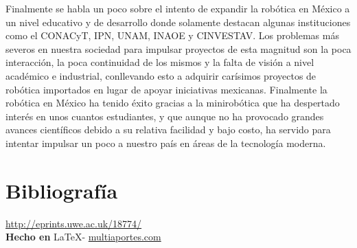 \documentclass{article}
\begin{document}
{Finalmente se habla un poco sobre el intento de expandir la robótica en México a un nivel educativo y de desarrollo donde solamente destacan algunas instituciones como el CONACyT, IPN, UNAM, INAOE y CINVESTAV. Los problemas más severos en nuestra sociedad para impulsar proyectos de esta magnitud son la poca interacción, la poca continuidad de los mismos y la falta de visión a nivel académico e industrial, conllevando esto a adquirir carísimos proyectos de robótica importados en lugar de apoyar iniciativas mexicanas. Finalmente la robótica en México ha tenido éxito gracias a la minirobótica que ha despertado interés en unos cuantos estudiantes, y que aunque no ha provocado grandes avances científicos debido a su relativa facilidad y bajo costo, ha servido para intentar impulsar un poco a nuestro país en áreas de la tecnología moderna.
}

\vspace{2cm}

\section*{Bibliograf\'ia}

\noindent \url{http://eprints.uwe.ac.uk/18774/}
\\

\large{\hfill \textbf{Hecho en } \LaTeX - \url{multiaportes.com}}
\end{document}
